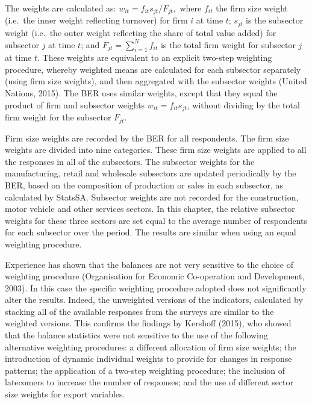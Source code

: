 \documentclass[11pt,]{article}
\begin{document}
The weights are calculated as: \(w_{it} = f_{it} s_{jt} / F_{jt} ,\)
where \(f_{it}\) the firm size weight (i.e.~the inner weight reflecting
turnover) for firm \(i\) at time \(t\); \(s_{jt}\) is the subsector
weight (i.e.~the outer weight reflecting the share of total value added)
for subsector \(j\) at time \(t\); and \(F_{jt} = \sum^N_{i=1} f_{it}\)
is the total firm weight for subsector \(j\) at time \(t\). These
weights are equivalent to an explicit two-step weighting procedure,
whereby weighted means are calculated for each subsector separately
(using firm size weights), and then aggregated with the subsector
weights (United Nations, 2015). The BER uses similar weights, except
that they equal the product of firm and subsector weights
\(w_{it} = f_{it} s_{jt}\), without dividing by the total firm weight
for the subsector \(F_{jt}\).

Firm size weights are recorded by the BER for all respondents. The firm
size weights are divided into nine categories. These firm size weights
are applied to all the responses in all of the subsectors. The subsector
weights for the manufacturing, retail and wholesale subsectors are
updated periodically by the BER, based on the composition of production
or sales in each subsector, as calculated by StatsSA. Subsector weights
are not recorded for the construction, motor vehicle and other services
sectors. In this chapter, the relative subsector weights for these three
sectors are set equal to the average number of respondents for each
subsector over the period. The results are similar when using an equal
weighting procedure.

Experience has shown that the balances are not very sensitive to the
choice of weighting procedure (Organisation for Economic Co-operation
and Development, 2003). In this case the specific weighting procedure
adopted does not significantly alter the results. Indeed, the unweighted
versions of the indicators, calculated by stacking all of the available
responses from the surveys are similar to the weighted versions. This
confirms the findings by Kershoff (2015), who showed that the balance
statistics were not sensitive to the use of the following alternative
weighting procedures: a different allocation of firm size weights; the
introduction of dynamic individual weights to provide for changes in
response patterns; the application of a two-step weighting procedure;
the inclusion of latecomers to increase the number of responses; and the
use of different sector size weights for export variables.
\end{document}
